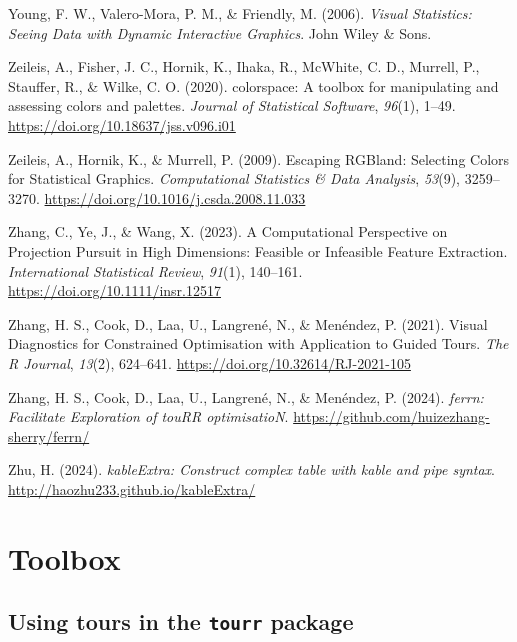 \documentclass[
  letterpaper,
]{krantz}
\newlength{\cslhangindent}
\newenvironment{CSLReferences}[2] %
 {\begin{list}{}{%
  \setlength{\itemindent}{0pt}
  \setlength{\leftmargin}{0pt}
  \setlength{\parsep}{0pt}
  \ifodd #1
   \setlength{\leftmargin}{\cslhangindent}
   \setlength{\itemindent}{-1\cslhangindent}
  \fi
  \setlength{\itemsep}{#2\baselineskip}}}
 {\end{list}}
\begin{document}
\begin{CSLReferences}{1}{0}
Young, F. W., Valero-Mora, P. M., \& Friendly, M. (2006). \emph{Visual
{S}tatistics: {S}eeing {D}ata with {D}ynamic {I}nteractive {G}raphics}.
John Wiley \& Sons.

Zeileis, A., Fisher, J. C., Hornik, K., Ihaka, R., McWhite, C. D.,
Murrell, P., Stauffer, R., \& Wilke, C. O. (2020). {colorspace}: A
toolbox for manipulating and assessing colors and palettes.
\emph{Journal of Statistical Software}, \emph{96}(1), 1--49.
\url{https://doi.org/10.18637/jss.v096.i01}

Zeileis, A., Hornik, K., \& Murrell, P. (2009). Escaping {RGB}land:
{S}electing {C}olors for {S}tatistical {G}raphics. \emph{Computational
Statistics \& Data Analysis}, \emph{53}(9), 3259--3270.
\url{https://doi.org/10.1016/j.csda.2008.11.033}

Zhang, C., Ye, J., \& Wang, X. (2023). A {C}omputational {P}erspective
on {P}rojection {P}ursuit in {H}igh {D}imensions: {F}easible or
{I}nfeasible {F}eature {E}xtraction. \emph{International Statistical
Review}, \emph{91}(1), 140--161.
\url{https://doi.org/10.1111/insr.12517}

Zhang, H. S., Cook, D., Laa, U., Langrené, N., \& Menéndez, P. (2021).
Visual {D}iagnostics for {C}onstrained {O}ptimisation with {A}pplication
to {G}uided {T}ours. \emph{The R Journal}, \emph{13}(2), 624--641.
\url{https://doi.org/10.32614/RJ-2021-105}

Zhang, H. S., Cook, D., Laa, U., Langrené, N., \& Menéndez, P. (2024).
\emph{{ferrn}: {F}acilitate {E}xploration of {touRR} {optimisatioN}}.
\url{https://github.com/huizezhang-sherry/ferrn/}

Zhu, H. (2024). \emph{kableExtra: Construct complex table with kable and
pipe syntax}. \url{http://haozhu233.github.io/kableExtra/}

\end{CSLReferences}

\cleardoublepage
{}
{}
\appendix

\chapter{Toolbox}\label{sec-toolbox}

\section{\texorpdfstring{Using tours in the \texttt{tourr}
package}{Using tours in the tourr package}}\label{using-tours-in-the-tourr-package}
\end{document}
